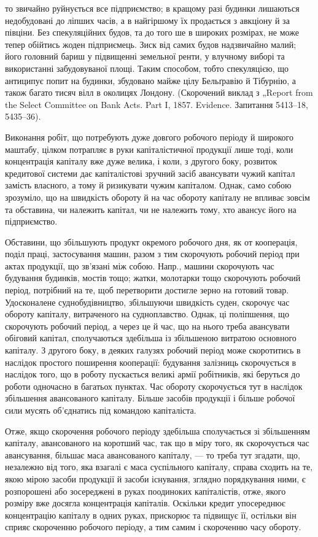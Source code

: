 \parcont{}  %
то звичайно руйнується все підприємство; в кращому разі будинки
лишаються недобудовані до ліпших часів, а в найгіршому їх продається
з авкціону й за півціни. Без спекуляційних будов, та до того ше в широких
розмірах, не може тепер обійтись жоден підприємець. Зиск від
самих будов надзвичайно малий; його головний бариш у підвищенні
земельної ренти, у влучному виборі та використанні забудовуваної площі.
Таким способом, тобто спекуляцією, що антиципує попит на будинки,
збудовано майже цілу Бельґравію й Тібурнію, а також багато тисяч вілл
в околицях Лондону. (Скорочений виклад з „Report from the Select
Committee on Bank Acts. Part I, 1857. Evidence. Запитання 5413--18,
5435--36).

Виконання робіт, що потребують дуже довгого робочого періоду й
широкого маштабу, цілком потрапляє в руки капіталістичної
продукції лише тоді, коли концентрація капіталу вже дуже велика, і
коли, з другого боку, розвиток кредитової системи дає капіталістові зручний
засіб авансувати чужий капітал замість власного, а тому й ризикувати
чужим капіталом. Однак, само собою зрозуміло, що на швидкість обороту
й на час обороту капіталу не впливає зовсім та обставина, чи належить
капітал, чи не належить тому, хто авансує його на підприємство.

Обставини, що збільшують продукт окремого робочого дня, як от кооперація,
поділ праці, застосування машин, разом з тим скорочують робочий
період при актах продукції, що зв’язані між собою. Напр., машини
скорочують час будування будинків, мостів тощо; жатки, молотарки
тощо скорочують робочий період, потрібний на те, щоб перетворити
достигле зерно на готовий товар. Удосконалене суднобудівництво, збільшуючи
швидкість суден, скорочує час обороту капіталу, витраченого на
судноплавство. Однак, ці поліпшення, що скорочують робочий період, а
через це й час, що на нього треба авансувати обіговий капітал, сполучаються
здебільша із збільшеною витратою основного капіталу. З другого
боку, в деяких галузях робочий період може скоротитись в наслідок
простого поширення кооперації: будування залізниць скорочується
в наслідок того, що в роботу пускається великі армії робітників, які
беруться до роботи одночасно в багатьох пунктах. Час обороту скорочується
тут в наслідок збільшення авансованого капіталу. Більше засобів
продукції і більше робочої сили мусять об’єднатись під командою
капіталіста.

Отже, якщо скорочення робочого періоду здебільша сполучається зі
збільшенням капіталу, авансованого на коротший час, так що в міру того,
як скорочується час авансування, більшає маса авансованого капіталу, — то
треба тут згадати, що, незалежно від того, яка взагалі є маса суспільного
капіталу, справа сходить на те, якою мірою засоби продукції й засоби
існування, зглядно порядкування ними, є розпорошені або зосереджені
в руках поодиноких капіталістів, отже, якого розміру вже
досягла концентрація капіталів. Оскільки кредит упосереднює концентрацію
капіталу в одних руках, прискорює та підвищує її, остільки він
сприяє скороченню робочого періоду, а тим самим і скороченню часу обороту.
